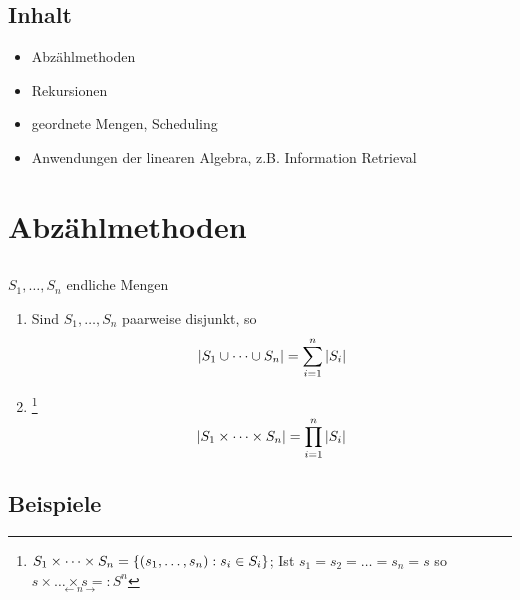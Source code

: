 \subsection*{Inhalt}
\begin{itemize}
	\item Abzählmethoden
	\item Rekursionen
	\item geordnete Mengen, Scheduling
	\item Anwendungen der linearen Algebra, z.B. Information Retrieval
\end{itemize}

\section{Abzählmethoden}

\subsection[Kardinalität paarweise disjunkter Mengen und des karthesischen Produkts]{} 
\label{subsec:disjcup(a)+kard(b)}
$S_1, \dots, S_n$ endliche Mengen
\begin{enumerate}
	\item  Sind $S_1, \dots, S_n$ paarweise disjunkt, so 
	\[\abs{S_1 \cup \dots \cup S_n} = \sum_{i=1}^{n}\abs{S_i}\]
	\item 
	\footnote{$S_1 \times \dots \times S_n = \left\{(s_1, \dots, s_n) : s_i \in S_i\right\}$; Ist  $s_1 = s_2 = \dots = s_n = s  $ so $\underset{\leftarrow n \rightarrow}{s \times \dots \times s =: S^n}$}
	\[ \left|S_1 \times \dots \times S_n\right| = \prod_{i=1}^n \left|S_i\right| 
	 \]
\end{enumerate}

\subsection[Beispiel : Kardinalität der Vereinigung paarweise disjunkter Mengen]{Beispiele}

